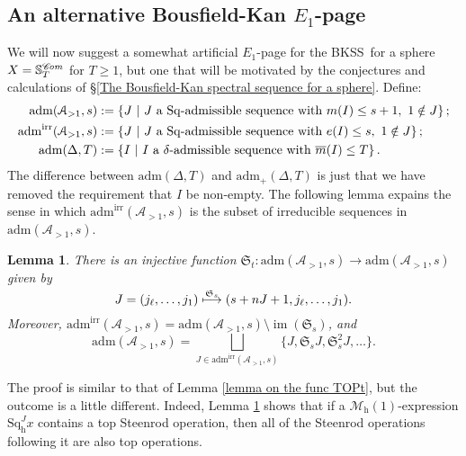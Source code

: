 \documentclass[11pt]{amsart} \renewcommand{\baselinestretch}{1.2}
\theoremstyle{plain}
\newtheorem{lem}[thm]{Lemma}
\numberwithin{equation}{section} %
\theoremstyle{plain}
\newtheorem{lem}[thm]{Lemma}
\numberwithin{equation}{chapter} %
\DeclareMathOperator{\im}{im}
\renewcommand{\to}{\longrightarrow}
\newcommand{\scrC}{\mathscr{C}}
\newcommand{\calA}{\mathcal{A}}
\newcommand{\calMh}{\mathcal{M}\dhor}
\newcommand{\minDimP}{\overline{m}}
\newcommand{\minDimDelta}{m}
\newcommand{\Sq}{\mathrm{Sq}}
\newcommand{\LieSteen}{\calA}
\newcommand{\aDT}{\mathrm{adm}_+(\Delta,T)}
\newcommand{\aDTnoplus}{\mathrm{adm}(\Delta,T)}
\newcommand{\aS}[1]{\mathrm{adm}(\LieSteen_{>1},#1)}
\newcommand{\aSirr}[1]{\mathrm{adm}^\mathrm{irr}(\LieSteen_{>1},#1)}
\newcommand{\algs}{{\scrC\!\textit{\normalfont\textit{om}}}}
\newcommand{\STOP}{\mathfrak{S}}
\newcommand{\dhor}{_\mathrm{h}}
\newcommand{\Sqh}{\mathrm{Sq}\dhor}
\newcommand{\BKSS}{BKSS}
\newcommand{\SubsectionOrSection}[1]{\subsection{#1}}
\begin{document}
\begin{Calculations of HWn}
\SubsectionOrSection{An alternative Bousfield-Kan $E_1$-page}
\label{An alternative Bousfield-Kan E1}
We will now suggest a somewhat artificial $E_1$-page for the \BKSS\ for a  sphere  $X=\mathbb{S}_{T}^{\algs}$ for $T\geq1$, but one that will be motivated by the conjectures and calculations of \S\ref{The Bousfield-Kan spectral sequence for a sphere}. 
Define:
\begin{alignat*}{2}
\aS{s}&:=\left\{J\ \middle|\ \textup{$J$ a $\Sq$-admissible sequence with }\minDimDelta(I)\leq s+1,\ 1\notin J\right\};\\
\aSirr{s}&:=\left\{J\ \middle|\ \textup{$J$ a $\Sq$-admissible sequence with }e(I)\leq s,\ 1\notin J\right\};\\
\aDTnoplus&:=\left\{I\ \middle|\ \textup{$I$ a $\delta$-admissible sequence with }\minDimP(I)\leq T\right\}.
\end{alignat*}
The difference between $\aDTnoplus$ and $\aDT$ is just that we have removed the requirement that $I$ be non-empty. The following lemma expains the sense in which $\aSirr{s}$ is the subset of irreducible sequences in $\aS{s}$.
\begin{lem}
\label{lemma on the func STOPs}
There is an injective function $\STOP_t:\aS{s}\to \aS{s}$ given by
\[J=(j_{\ell},\ldots,j_1)\overset{\smash{\STOP_s}}{\longmapsto }(s+nJ+1,j_\ell,\ldots,j_1).\]
Moreover, $\aSirr{s}=\aS{s}\setminus\im(\STOP_s)$, and
\[\aS{s}=\textstyle\bigsqcup_{J\in \aSirr{s}}\{J,\STOP_s J,\STOP_s^2 J,\ldots\}.\]
\end{lem}
\noindent The proof is similar to that of Lemma \ref{lemma on the func TOPt}, but the outcome is a little different. Indeed, Lemma \ref{lemma on the func STOPs} shows that if a $\calMh(1)$-expression $\Sqh^{J}x$ contains a top Steenrod operation, then all of the Steenrod operations following it are also top operations.


\end{Calculations of HWn}
\end{document}
